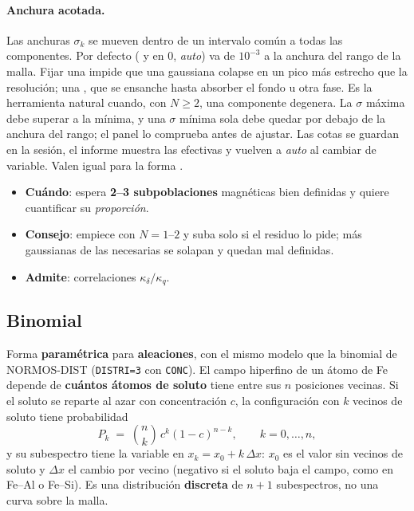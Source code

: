 \paragraph{Anchura acotada.} Las anchuras $\sigma_k$ se mueven dentro de un
intervalo común a todas las componentes. Por defecto ( y
 en $0$, \emph{auto}) va de $10^{-3}$ a la anchura del rango
de la malla. Fijar una  impide que una gaussiana colapse en un
pico más estrecho que la resolución; una , que se ensanche
hasta absorber el fondo u otra fase. Es la herramienta natural cuando, con
$N\ge2$, una componente degenera. La $\sigma$ máxima debe superar a la mínima, y
una $\sigma$ mínima sola debe quedar por debajo de la anchura del rango; el panel
lo comprueba antes de ajustar. Las cotas se guardan en la sesión, el informe
muestra las efectivas y vuelven a \emph{auto} al cambiar de variable. Valen
igual para la forma .

\begin{itemize}[nosep]
  \item \textbf{Cuándo}: espera \textbf{2--3 subpoblaciones} magnéticas bien
        definidas y quiere cuantificar su \emph{proporción}.
  \item \textbf{Consejo}: empiece con $N=1$--$2$ y suba solo si el residuo lo pide;
        más gaussianas de las necesarias se solapan y quedan mal definidas.
  \item \textbf{Admite}: correlaciones $\kappa_\delta/\kappa_q$.
\end{itemize}

\subsection{Binomial}
\label{sec:forma-binomial}

Forma \textbf{paramétrica} para \textbf{aleaciones}, con el mismo modelo que la
binomial de NORMOS-DIST (\texttt{DISTRI=3} con \texttt{CONC}). El campo
hiperfino de un átomo de Fe depende de \textbf{cuántos átomos de soluto} tiene
entre sus $n$ posiciones vecinas. Si el soluto se reparte al azar con
concentración $c$, la configuración con $k$ vecinos de soluto tiene probabilidad
\[
  P_k \;=\; \binom{n}{k}\, c^k (1-c)^{n-k}, \qquad k = 0,\ldots,n,
\]
y su subespectro tiene la variable en $x_k = x_0 + k\,\Delta x$: $x_0$ es el
valor sin vecinos de soluto y $\Delta x$ el cambio por vecino (negativo si el
soluto baja el campo, como en Fe--Al o Fe--Si). Es una distribución
\textbf{discreta} de $n+1$ subespectros, no una curva sobre la malla.

